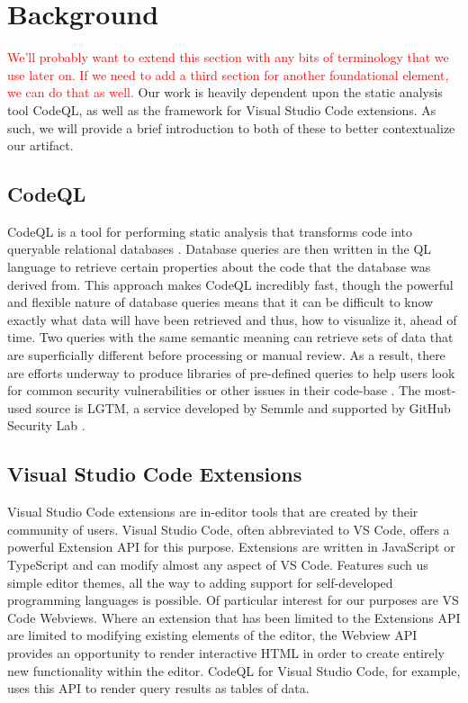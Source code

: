 \documentclass[sigplan,10pt,review]{acmart}
\begin{document}
\section{Background}
\textcolor{red}{We'll probably want to extend this section with any bits of terminology that we use later on. If we need to add a third section for another foundational element, we can do that as well.\newline}
Our work is heavily dependent upon the static analysis tool CodeQL, as well as the framework for Visual Studio Code extensions. As such, we will provide a brief introduction to both of these to better contextualize our artifact.

\subsection{CodeQL}
CodeQL is a tool for performing static analysis that transforms code into queryable relational databases \cite{Semmle_CodeQL_About}. Database queries are then written in the QL language to retrieve certain properties about the code that the database was derived from. This approach makes CodeQL incredibly fast, though the powerful and flexible nature of database queries means that it can be difficult to know exactly what data will have been retrieved and thus, how to visualize it, ahead of time.
\newline
\indent Two queries with the same semantic meaning can retrieve sets of data that are superficially different before processing or manual review. As a result, there are efforts underway to produce libraries of pre-defined queries to help users look for common security vulnerabilities or other issues in their code-base \cite{Semmle_LGTM}. The most-used source is LGTM, a service developed by Semmle and supported by GitHub Security Lab \cite{GitHub_SecurtyLab_CodeQL}.

\subsection{Visual Studio Code Extensions}
Visual Studio Code extensions are in-editor tools that are created by their community of users. Visual Studio Code, often abbreviated to VS Code, offers a powerful Extension API for this purpose. Extensions are written in JavaScript or TypeScript and can modify almost any aspect of VS Code. Features such us simple editor themes, all the way to adding support for self-developed programming languages is possible.
\newline
\indent Of particular interest for our purposes are VS Code Webviews. Where an extension that has been limited to the Extensions API are limited to modifying existing elements of the editor, the Webview API provides an opportunity to render interactive HTML in order to create entirely new functionality within the editor. CodeQL for Visual Studio Code, for example, uses this API to render query results as tables of data.
\end{document}
